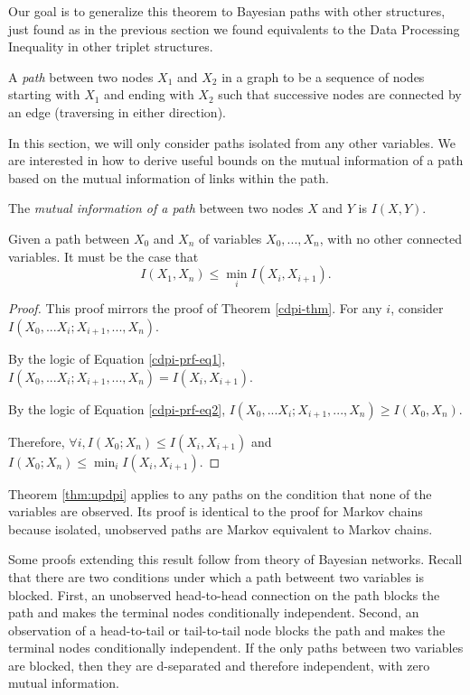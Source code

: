 \documentclass[../thesis.tex]{subfiles}
\begin{document}
Our goal is to generalize this theorem to Bayesian paths
with other structures, just found as in the previous section
we found equivalents to the Data Processing Inequality in
other triplet structures.

\begin{dfn}[Path]
A \emph{path} between two nodes \(X_1\) and \(X_2\) in a graph 
to be a sequence of nodes starting with \(X_1\) and ending with \(X_2\)
such that successive nodes are connected by an edge (traversing
in either direction).
\end{dfn}

In this section, we will only consider paths isolated from
any other variables.
We are interested in how to derive useful bounds on the
mutual information of a path based on the mutual information
of links within the path.

\begin{dfn}
  The \emph{mutual information of a path} between two nodes \(X\) and \(Y\)
  is $I(X,Y)$.
\end{dfn}

\begin{thm}
  \label{thm:updpi}
  Given a path between $X_0$ and $X_n$
  of variables $X_0, ..., X_n$, with no other connected variables.
  It must be the case that
  $$I(X_1,X_n) \leq \min_{i} I(X_i,X_{i+1}).$$
\end{thm}
\begin{proof}
  This proof mirrors the proof of Theorem \ref{cdpi-thm}.
  For any $i$, consider $I(X_0,...X_i;X_{i+1},...,X_n)$.

  By the logic of Equation \ref{cdpi-prf-eq1},
  $I(X_0,...X_i;X_{i+1},...,X_n) = I(X_i,X_{i+1})$.

  By the logic of Equation \ref{cdpi-prf-eq2},
  $I(X_0,...X_i;X_{i+1},...,X_n) \geq I(X_0,X_n)$.

  Therefore, $\forall i, I(X_0;X_n) \leq I(X_i,X_{i+1})$
  and $I(X_0;X_n) \leq \min_i I(X_i,X_{i+1})$.
\end{proof}

Theorem \ref{thm:updpi} applies to any paths on the condition
that none of the variables are observed.
Its proof is identical to the proof for Markov chains because
isolated, unobserved paths are Markov equivalent to Markov chains.

Some proofs extending this result follow from theory of Bayesian
networks. Recall that there are two conditions under which a
path betweent two variables is blocked.
First, an unobserved head-to-head connection on the
path blocks the path and makes the terminal nodes conditionally
independent. Second, an observation of a head-to-tail or tail-to-tail
node blocks the path and makes the terminal nodes conditionally
independent.
If the only paths between two variables are blocked, then they
are d-separated and therefore independent, with zero mutual information.
\end{document}
